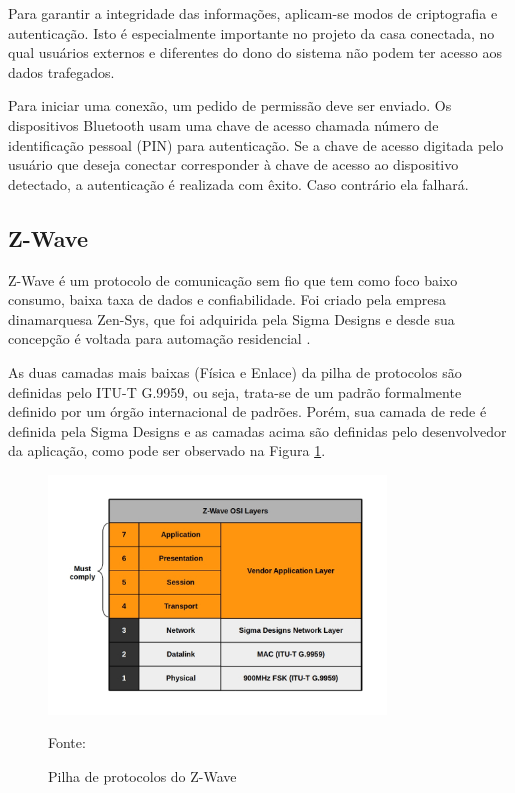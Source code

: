 Para garantir a integridade das informações, aplicam-se modos de criptografia e autenticação. Isto é especialmente importante no projeto da casa conectada, no qual usuários externos e diferentes do dono do sistema não podem ter acesso aos dados trafegados. 

Para iniciar uma conexão, um pedido de permissão deve ser enviado. Os dispositivos Bluetooth usam uma chave de acesso chamada número de identificação pessoal (PIN) para autenticação. Se a chave de acesso digitada pelo usuário que deseja conectar corresponder à chave de acesso ao dispositivo detectado, a autenticação é realizada com êxito. Caso contrário ela falhará. 

\subsection{Z-Wave}
Z-Wave é um protocolo de comunicação sem fio que tem como foco baixo consumo, baixa taxa de dados e confiabilidade. Foi criado pela empresa dinamarquesa Zen-Sys, que foi adquirida pela Sigma Designs e desde sua concepção é voltada para automação residencial \cite{wikizwave,zwavelayers}.

As duas camadas mais baixas (Física e Enlace) da pilha de protocolos são definidas pelo ITU-T G.9959, ou seja, trata-se de um padrão formalmente definido por um órgão internacional de padrões. Porém, sua camada de rede é definida pela Sigma Designs e as camadas acima são definidas pelo desenvolvedor da aplicação, como pode ser observado na Figura \ref{fig:zwavelayers}.


\begin{figure}[h]
	\centering
	\caption{Pilha de protocolos do Z-Wave}
  \includegraphics[width=0.8\textwidth]{imagens/zwavelayers.jpg}
  \label{fig:zwavelayers}
  
    Fonte: \cite{zwavelayers}
\end{figure}

